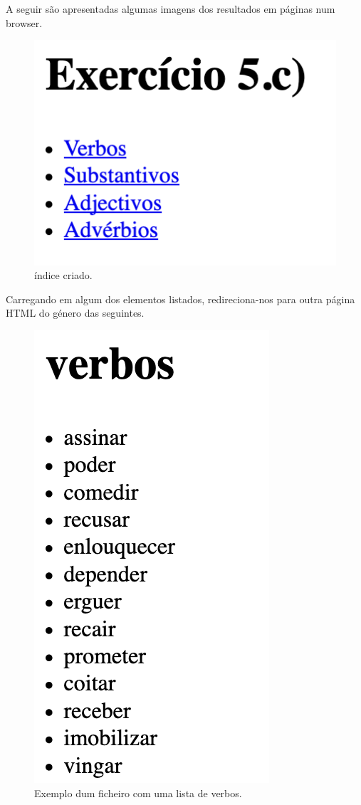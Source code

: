 \documentclass[11pt,a4paper]{report}
\begin{document}
A seguir são apresentadas algumas imagens dos resultados em páginas num browser.

\begin{figure}[H]
\centering
\includegraphics[scale=0.6]{index.png}
\caption{índice criado.}
\label{img:index}
\end{figure}

Carregando em algum dos elementos listados, redireciona-nos para outra página HTML do género das seguintes.

\begin{figure}[H]
\centering
\includegraphics[scale=0.6]{verbos.png}
\caption{Exemplo dum ficheiro com uma lista de verbos.}
\label{img:verbos}
\end{figure}
\end{document}
